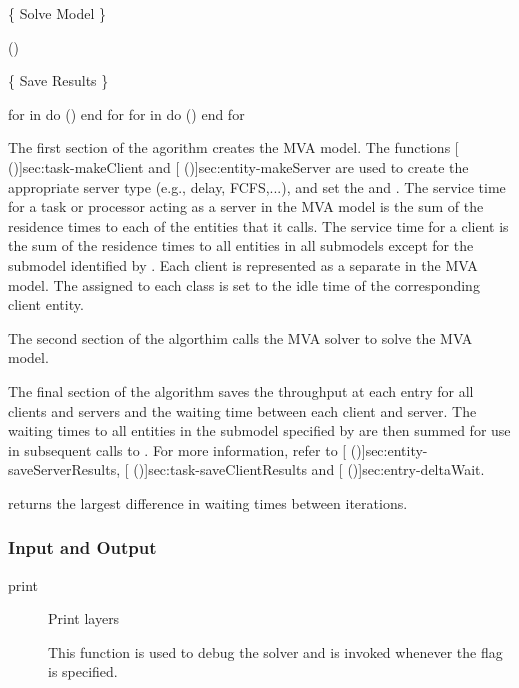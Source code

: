 \begin{description}
\begin{example}
  \{ Solve Model \}

  ()

  \{ Save Results \}

  for  in  do
    ()
  end for
  for  in  do
    ()
  end for
\end{example}

The first section of the agorithm creates the MVA model.  The
functions [ (\Sec\Ref)]{sec:task-makeClient}
and [ (\Sec\Ref)]{sec:entity-makeServer} are
used to create the appropriate server type (e.g., delay, FCFS,...),
and set the  and .  The service
time for a task or processor acting as a server in the MVA model is
the sum of the residence times to each of the entities that it calls.
The service time for a client is the sum of the residence times to all
entities in all submodels except for the submodel identified by
.  Each client is represented as a separate
 in the MVA model.  The  assigned to each
class is set to the idle time of the corresponding client entity.

The second section of the algorthim calls the MVA solver to solve the
MVA model.

The final section of the algorithm saves the throughput at each entry
for all clients and servers and the waiting time between each client
and server.  The waiting times to all entities in the submodel
specified by  are then summed for use in subsequent
calls to .  For more information, refer to
[
(\Sec\Ref)]{sec:entity-saveServerResults},
[
(\Sec\Ref)]{sec:task-saveClientResults} and [
(\Sec\Ref)]{sec:entry-deltaWait}.

 returns the largest difference in waiting times
between iterations.

\end{description}


\subsubsection{Input and Output}
\begin{description}
\item[print] \texonly{---} Print layers \\

This function is used to debug the solver and is invoked whenever the
 flag is specified.

\end{description}

